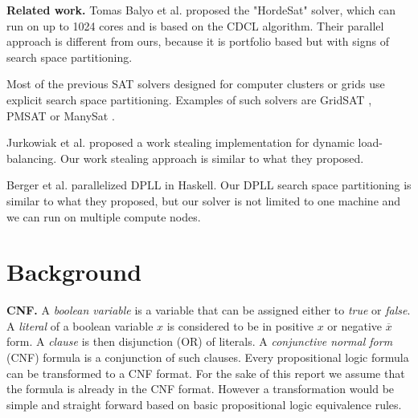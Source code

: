 \documentclass[letterpaper]{article}
\newcommand{\mypar}[1]{{\bf #1.}}
\begin{document}

\mypar{Related work}
Tomas Balyo et al. proposed the "HordeSat" solver, which can run on up to 1024 cores and is based on the CDCL algorithm.
Their parallel approach is different from ours, because it is portfolio based but with signs of search space partitioning. \cite{hordesat}

Most of the previous SAT solvers designed for computer clusters or grids use explicit search space partitioning.
Examples of such solvers are GridSAT \cite{gridsat}, PMSAT \cite{pmsat} or ManySat \cite{manysat}.

Jurkowiak et al. proposed a work stealing implementation for dynamic load-balancing. \cite{stealing}
Our work stealing approach is similar to what they proposed.

Berger et al. parallelized DPLL in Haskell. \cite{dpll_haskell}
Our DPLL search space partitioning is similar to what they proposed, but our solver is not limited to one machine and we can run on multiple compute nodes.

\section{Background}\label{sec:background}

\mypar{CNF}
A \textit{boolean variable} is a variable that can be assigned either to \textit{true} or \textit{false}.
A \textit{literal} of a boolean variable $x$ is considered to be in positive $x$ or negative  $\overline{x}$ form.
A \textit{clause} is then disjunction (OR) of literals.
A \textit{conjunctive normal form} (CNF) formula is a conjunction of such clauses.
Every propositional logic formula can be transformed to a CNF format.
For the sake of this report we assume that the formula is already in the CNF format.
However a transformation would be simple and straight forward based on basic propositional logic equivalence rules.
\end{document}

